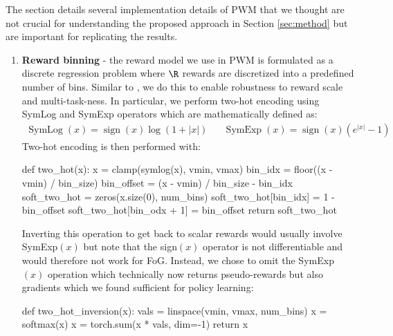 The section details several implementation details of PWM that we thought are not crucial for understanding the proposed approach in Section \ref{sec:method} but are important for replicating the results.
\begin{enumerate}
    \item \textbf{Reward binning} - the reward model we use in PWM is formulated as a discrete regression problem where $\R$ rewards are discretized into a predefined number of bins. Similar to \citep{hansen2023td,lee2023differentiable}, we do this to enable robustness to reward scale and multi-task-ness. In particular, we perform two-hot encoding using SymLog and SymExp operators which are mathematically defined as:
    \begin{align*}
        \operatorname{SymLog}(x) = \operatorname{sign}(x) \log(1+|x|) && \operatorname{SymExp}(x)= \operatorname{sign}(x) (e^{|x|} - 1) 
    \end{align*}
    Two-hot encoding is then performed with:
    \begin{python}
        def two_hot(x):
            x = clamp(symlog(x), vmin, vmax)
            bin_idx = floor((x - vmin) / bin_size)
            bin_offset = (x - vmin) / bin_size - bin_idx
            soft_two_hot = zeros(x.size(0), num_bins)
            soft_two_hot[bin_idx] = 1 - bin_offset
            soft_two_hot[bin_odx + 1] = bin_offset
            return soft_two_hot
    \end{python}
    Inverting this operation to get back to scalar rewards would usually involve SymExp$(x)$ but note that the sign$(x)$ operator is not differentiable and would therefore not work for FoG. Instead, we chose to omit the SymExp$(x)$ operation which technically now returns pseudo-rewards but also gradients which we found sufficient for policy learning:
    \begin{python}
        def two_hot_inversion(x):
            vals = linspace(vmin, vmax, num_bins)
            x = softmax(x)
            x = torch.sum(x * vals, dim=-1)
            return x
    \end{python}


\end{enumerate}
